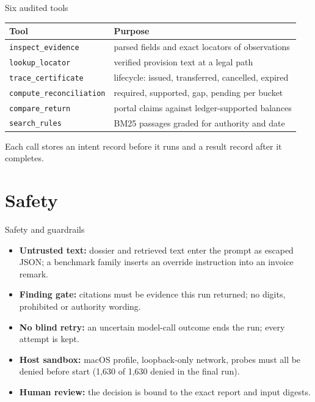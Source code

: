 \documentclass[aspectratio=169,10pt]{beamer}
\newcommand{\code}[1]{\texttt{\small #1}}
\begin{document}
\begin{frame}{Six audited tools}
\small
\begin{tabularx}{\linewidth}{@{}l X@{}}
\toprule
\textbf{Tool} & \textbf{Purpose} \\ \midrule
\code{inspect\_evidence} & parsed fields and exact locators of observations \\
\code{lookup\_locator} & verified provision text at a legal path \\
\code{trace\_certificate} & lifecycle: issued, transferred, cancelled, expired \\
\code{compute\_reconciliation} & required, supported, gap, pending per bucket \\
\code{compare\_return} & portal claims against ledger-supported balances \\
\code{search\_rules} & BM25 passages graded for authority and date \\
\bottomrule
\end{tabularx}

\medskip\small Each call stores an intent record before it runs and a result record after it completes.
\end{frame}

\section{Safety}
\begin{frame}{Safety and guardrails}
\begin{itemize}
\item \textbf{Untrusted text:} dossier and retrieved text enter the prompt as escaped JSON; a benchmark family inserts an override instruction into an invoice remark.
\item \textbf{Finding gate:} citations must be evidence this run returned; no digits, prohibited or authority wording.
\item \textbf{No blind retry:} an uncertain model-call outcome ends the run; every attempt is kept.
\item \textbf{Host sandbox:} macOS profile, loopback-only network, probes must all be denied before start (1,630 of 1,630 denied in the final run).
\item \textbf{Human review:} the decision is bound to the exact report and input digests.
\end{itemize}
\end{frame}
\end{document}
